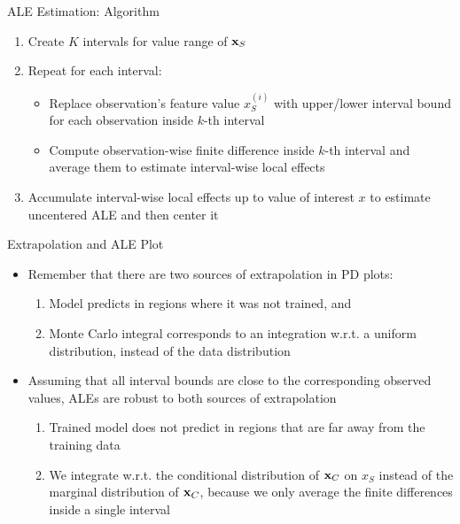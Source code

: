 \documentclass[11pt,compress,t,notes=noshow, aspectratio=169, xcolor=table]{beamer}
\begin{document}
\begin{frame}{ALE Estimation: Algorithm}

\begin{enumerate}
	\item Create $K$ intervals for value range of $\xv_S$
	\item Repeat for each interval: %
	  \begin{itemize}
	  \item Replace observation's feature value $x_S^{(i)}$ with upper/lower interval bound for each observation inside $k$-th interval
	  \item Compute observation-wise finite difference inside $k$-th interval and average them to estimate interval-wise local effects
	  \end{itemize}
  \item Accumulate interval-wise local effects up to value of interest $x$ to estimate uncentered ALE and then center it
\end{enumerate}

\end{frame}

\begin{frame}{Extrapolation and ALE Plot}
\begin{itemize}
\item Remember that there are two sources of extrapolation in PD plots:
  \begin{enumerate}
  \item Model predicts in regions where it was not trained, and
  \item Monte Carlo integral corresponds to an integration w.r.t. a uniform distribution, instead of the data distribution
  \end{enumerate}
\item Assuming that all interval bounds are close to the corresponding observed values, ALEs are robust to both sources of extrapolation
  \begin{enumerate}
    \item Trained model does not predict in regions that are far away from the training data
    \item We integrate w.r.t. the conditional distribution of $\xv_C$ on $x_S$ instead of the marginal distribution of $\xv_C$, because we only average the finite differences inside a single interval
  \end{enumerate}
\end{itemize}
\end{frame}
\end{document}
